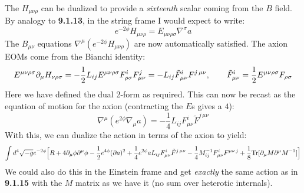 \documentclass[11pt, class=article, crop=false]{standalone}
\begin{document}
\begin{enumerate}
	
	The $H_{\mu \nu \rho}$ can be dualized to provide a \emph{sixteenth} scalar coming from the $B$ field. By analogy to \textbf{9.1.13}, in the string frame I would expect to write:
	\[
		e^{-2\phi} H_{\mu \nu \rho} = E_{\mu \nu \rho \sigma} \nabla^\sigma a
	\]
	The $B_{\mu \nu}$ equations $\nabla^\mu (e^{-2\phi} H_{\mu \nu \rho})$ are now automatically satisfied. The axion EOMs come from the Bianchi identity:
	\[
		E^{\mu \nu \rho \sigma} \partial_\mu H_{\nu \rho \sigma } = - \frac12 L_{ij} E^{\mu \nu \rho \sigma} F^i_{\rho \sigma} F^j_{\mu \nu} = - L_{ij} \tilde F^{i}_{\mu \nu} F^{j\, \mu \nu}, \qquad \tilde F_{\mu \nu}^i  = \frac12 E^{\mu \nu \rho \sigma} F_{\rho \sigma}
	\]
	Here we have defined the dual 2-form as required. This can now be recast as the equation of motion for the axion (contracting the $E$s gives a $4$):
	\[
		\nabla^\mu (e^{2 \phi} \nabla_\mu a) = -\frac14 L_{ij} F^i_{\mu \nu} \tilde F^{j\, \mu \nu}
	\]
	With this, we can dualize the action in terms of the axion to yield:
	\[
		\int d^4 \sqrt{-g} e^{-2\phi} \Big[R + 4 \partial_\mu \phi \partial^\mu \phi  -\frac12 e^{4\phi} (\partial a)^2+ \frac14 e^{2\phi} a L_{ij} F^i_{\mu \nu} \tilde F^{j\, \mu \nu}  - \frac14 M_{ij}^{-1} F_{\mu \nu}^{i} F^{\mu \nu\, j} + \frac18 \mathrm{Tr}[\partial_\mu M \partial^\mu M^{-1}]\Big]
	\]
	We could also do this in the Einstein frame and get \emph{exactly} the same action as in \textbf{9.1.15} with the $M$ matrix as we have it (no sum over heterotic internals). 
	

\end{enumerate}
\end{document}
